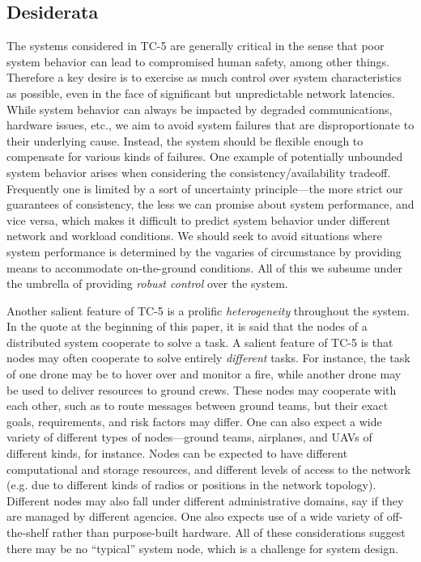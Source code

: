 \subsection{Desiderata}

The systems considered in TC-5 are generally critical in the sense that poor system behavior can lead to compromised human safety, among other things. Therefore a key desire is to exercise as much control over system characteristics as possible, even in the face of significant but unpredictable network latencies. While system behavior can always be impacted by degraded communications, hardware issues, etc., we aim to avoid system failures that are disproportionate to their underlying cause. Instead, the system should be flexible enough to compensate for various kinds of failures. One example of potentially unbounded system behavior arises when considering the consistency/availability tradeoff. Frequently one is limited by a sort of uncertainty principle---the more strict our guarantees of consistency, the less we can promise about system performance, and vice versa, which makes it difficult to predict system behavior under different network and workload conditions. We should seek to avoid situations where system performance is determined by the vagaries of circumstance by providing means to accommodate on-the-ground conditions. All of this we subsume under the umbrella of providing \emph{robust control} over the system.

Another salient feature of TC-5 is a prolific \emph{heterogeneity} throughout the system. In the quote at the beginning of this paper, it is said that the nodes of a distributed system cooperate to solve a task.  A salient feature of TC-5 is that nodes may often cooperate to solve entirely \emph{different} tasks. For instance, the task of one drone may be to hover over and monitor a fire, while another drone may be used to  deliver resources to ground crews. These nodes may cooperate with each other, such as to route messages between ground teams, but their exact goals, requirements, and risk factors may differ. One can also expect a wide variety of different types of nodes---ground teams, airplanes, and UAVs of different kinds, for instance. Nodes can be expected to have different computational and storage resources, and  different levels of access to the network (e.g. due to different kinds of radios or positions in the network topology). Different nodes may also fall under different administrative domains, say if they are managed by different agencies. One also expects use of a wide variety of off-the-shelf rather than purpose-built hardware. All of these considerations suggest there may be no ``typical'' system node, which is a challenge for system design.

